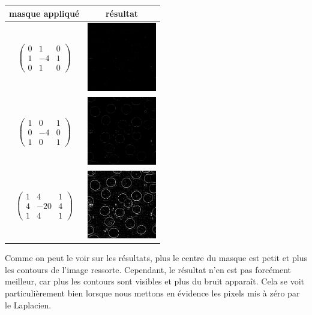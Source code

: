 \documentclass[a4paper,11pt]{article}
\begin{document}
  \begin{center}
  \begin{tabular}{|c|c|}
   \hline
   masque appliqué & résultat\\
   \hline
   $\begin{pmatrix} 0 & 1 & 0\\ 1 & -4 & 1\\ 0 & 1 & 0 \end{pmatrix}$ & \includegraphics[width=3cm]{../convolution0.png}\\
   \hline
   $\begin{pmatrix} 1 & 0 & 1\\ 0 & -4 & 0\\ 1 & 0 & 1 \end{pmatrix}$ & \includegraphics[width=3cm]{../convolution1.png}\\
   \hline
   $\begin{pmatrix} 1 & 4 & 1\\ 4 & -20 & 4\\ 1 & 4 & 1 \end{pmatrix}$ & \includegraphics[width=3cm]{../convolution4.png}\\
   \hline
  \end{tabular}
  \end{center}

  Comme on peut le voir sur les résultats, plus le centre du masque est petit et plus les contours de l'image ressorte. 
  Cependant, le résultat n'en est pas forcément meilleur, car plus les contours sont visibles et plus du bruit apparaît.
  Cela se voit particulièrement bien lorsque nous mettons en évidence les pixels mis à zéro par le Laplacien.
  
\end{document}
